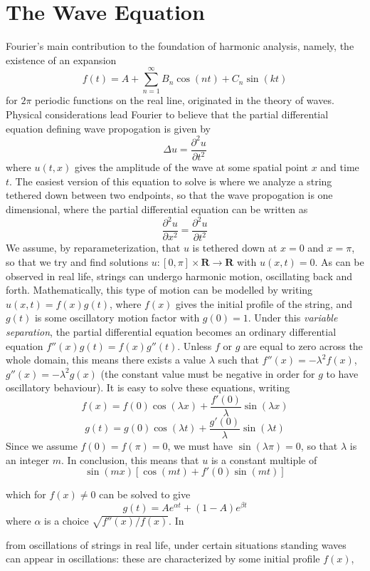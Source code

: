 \section{The Wave Equation}

Fourier's main contribution to the foundation of harmonic analysis, namely, the existence of an expansion
%
\[ f(t) = A + \sum_{n = 1}^\infty B_n \cos(nt) + C_n \sin(kt) \]
%
for $2\pi$ periodic functions on the real line, originated in the theory of waves. Physical considerations lead Fourier to believe that the partial differential equation defining wave propogation is given by
%
\[ \Delta u = \frac{\partial^2 u}{\partial t^2} \]
%
where $u(t,x)$ gives the amplitude of the wave at some spatial point $x$ and time $t$. The easiest version of this equation to solve is where we analyze a string tethered down between two endpoints, so that the wave propogation is one dimensional, where the partial differential equation can be written as
%
\[ \frac{\partial^2 u}{\partial x^2} = \frac{\partial^2 u}{\partial t^2} \]
%
We assume, by reparameterization, that $u$ is tethered down at $x = 0$ and $x = \pi$, so that we try and find solutions $u: [0,\pi] \times \mathbf{R} \to \mathbf{R}$ with $u(x,t) = 0$. As can be observed  in real life, strings can undergo harmonic motion, oscillating back and forth. Mathematically, this type of motion can be modelled by writing $u(x,t) = f(x) g(t)$, where $f(x)$ gives the initial profile of the string, and $g(t)$ is some oscillatory motion factor with $g(0) = 1$. Under this {\it variable separation}, the partial differential equation becomes an ordinary differential equation $f''(x) g(t) = f(x) g''(t)$. Unless $f$ or $g$ are equal to zero across the whole domain, this means there exists a value $\lambda$ such that $f''(x) = - \lambda^2 f(x)$, $g''(x) = - \lambda^2 g(x)$ (the constant value must be negative in order for $g$ to have oscillatory behaviour). It is easy to solve these equations, writing
%
\[ f(x) = f(0) \cos(\lambda x) + \frac{f'(0)}{\lambda} \sin(\lambda x) \]
\[ g(t) = g(0) \cos(\lambda t) + \frac{g'(0)}{\lambda} \sin(\lambda t) \]
%
Since we assume $f(0) = f(\pi) = 0$, we must have $\sin(\lambda \pi) = 0$, so that $\lambda$ is an integer $m$. In conclusion, this means that $u$ is a constant multiple of
%
\[ \sin(mx)[\cos(mt) + f'(0) \sin(mt)] \]

which for $f(x) \neq 0$ can be solved to give
%
\[ g(t) = Ae^{\alpha t} + (1-A)e^{\beta t} \]
%
where $\alpha$ is a choice $\sqrt{f''(x)/f(x)}$. In

from oscillations of strings in real life, under certain situations standing waves can appear in oscillations: these are characterized by some initial profile $f(x)$,

